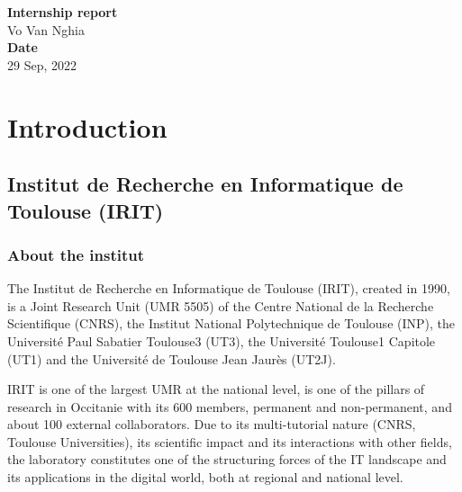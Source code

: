 \documentclass[
  a4paper, xcolor = usenames,dvipsnames]{article}
\author{}
\date{\vspace{-2.5em}}
\begin{document}
\onehalfspacing


\vspace*{\fill}
\begin{center}
  \Large{\textbf{Internship report}}\\
  \vspace*{1\baselineskip}
  Vo Van Nghia\\
  \vfill
  \vspace*{\fill}
  \Large{\textbf{Date}}\\
  29 Sep, 2022
\end{center}

\newpage

\newpage
{}
\renewcommand{\contentsname}{Table of contents}
\tableofcontents

\newpage
{}

\hypertarget{introduction}{%
\section{Introduction}\label{introduction}}

\hypertarget{institut-de-recherche-en-informatique-de-toulouse-irit}{%
\subsection{Institut de Recherche en Informatique de Toulouse (IRIT)}\label{institut-de-recherche-en-informatique-de-toulouse-irit}}

\hypertarget{about-the-institut}{%
\subsubsection{About the institut}\label{about-the-institut}}

The Institut de Recherche en Informatique de Toulouse (IRIT), created in 1990, is a Joint Research Unit (UMR 5505) of the Centre National de la Recherche Scientifique (CNRS), the Institut National Polytechnique de Toulouse (INP), the Université Paul Sabatier Toulouse3 (UT3), the Université Toulouse1 Capitole (UT1) and the Université de Toulouse Jean Jaurès (UT2J).

IRIT is one of the largest UMR at the national level, is one of the pillars of research in Occitanie with its 600 members, permanent and non-permanent, and about 100 external collaborators. Due to its multi-tutorial nature (CNRS, Toulouse Universities), its scientific impact and its interactions with other fields, the laboratory constitutes one of the structuring forces of the IT landscape and its applications in the digital world, both at regional and national level.
\end{document}
